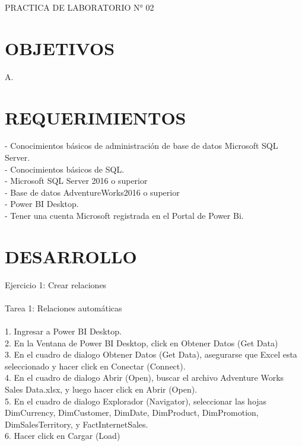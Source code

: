 \begin{center}
    PRACTICA DE LABORATORIO N° 02
\end{center}

\section{OBJETIVOS}
A.

\section{REQUERIMIENTOS}

\begin{itemize}

- Conocimientos básicos de administración de base de datos Microsoft   SQL Server.
\\- Conocimientos básicos de SQL.
\\- Microsoft SQL Server 2016 o superior
\\- Base de datos AdventureWorks2016 o superior
\\- Power BI Desktop.
\\- Tener una cuenta Microsoft registrada en el Portal de Power Bi.
\end{itemize}

\section{DESARROLLO} 

\begin{itemize}
    Ejercicio 1: Crear relaciones \\\\
    Tarea 1: Relaciones automáticas\\\\
    1.  Ingresar a Power BI Desktop.\\
    2.  En la Ventana de Power BI Desktop, click en Obtener Datos (Get Data)\\
    3.  En el cuadro de dialogo Obtener Datos (Get Data), asegurarse que Excel esta seleccionado y hacer click
        en Conectar (Connect).\\
    4.  En el cuadro de dialogo Abrir (Open), buscar el archivo Adventure Works Sales Data.xlsx, y luego hacer
click en Abrir (Open).\\
    5.  En el cuadro de dialogo Explorador (Navigator), seleccionar las hojas DimCurrency, DimCustomer,
DimDate, DimProduct, DimPromotion, DimSalesTerritory, y FactInternetSales.\\
    6.  Hacer click en Cargar (Load)\\

\end{itemize} 

